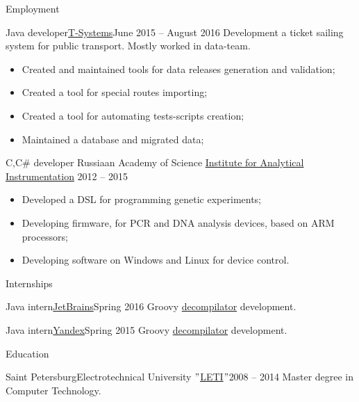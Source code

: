 \documentclass[]{mcdowellcv}
\begin{document}
\begin{cvsection}{Employment}
		\begin{cvsubsection}{Java developer}{\href{https://www.t-systems.com/ru/en}{T-Systems}}{June 2015 -- August 2016}
			Development a ticket sailing system for public transport. Mostly worked in data-team.
			\begin{itemize}
				\item Created and maintained tools for data releases generation and validation;
				\item Created a tool for special routes importing;
				\item Created a tool for automating tests-scripts creation;
				\item Maintained a database and migrated data;
			\end{itemize}
		\end{cvsubsection}

		\begin{cvsubsection}{C,C$\#$ developer}
		{Russiaan Academy of Science \href{http://iairas.ru/en/}{Institute for Analytical Instrumentation}}
		{2012 -- 2015}
			\begin{itemize}
				\item Developed a DSL for programming genetic experiments;
				\item Developing firmware, for PCR and DNA analysis devices, based on ARM processors;
				\item Developing software on Windows and Linux for device control.
			\end{itemize}
		\end{cvsubsection}
	\end{cvsection}

	\begin{cvsection}{Internships}
		\begin{cvsubsection}{Java intern}{\href{https://www.jetbrains.com/}{JetBrains}}{Spring 2016}
			Groovy \href{https://github.com/dehasi/groovy-dc}{decompilator} development.
		\end{cvsubsection}
		\begin{cvsubsection}{Java intern}{\href{https://yandex.com/company/}{Yandex}}{Spring 2015}
			Groovy \href{https://github.com/dehasi/groovy-dc}{decompilator} development.
		\end{cvsubsection}
	\end{cvsection}

	\begin{cvsection}{Education}
		\begin{cvsubsection}{Saint Petersburg}{Electrotechnical University $"$\href{https://etu.ru/en/university/}{LETI}$"$}{2008 -- 2014}
			Master degree in Computer Technology.
		\end{cvsubsection}
	\end{cvsection}
\end{document}
